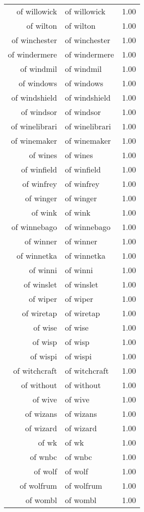 \begin{table}[ht]
\begin{tabular}{rlr}
  of willowick & of willowick & 1.00 \\ 
  of wilton & of wilton & 1.00 \\ 
  of winchester & of winchester & 1.00 \\ 
  of windermere & of windermere & 1.00 \\ 
  of windmil & of windmil & 1.00 \\ 
  of windows & of windows & 1.00 \\ 
  of windshield & of windshield & 1.00 \\ 
  of windsor & of windsor & 1.00 \\ 
  of winelibrari & of winelibrari & 1.00 \\ 
  of winemaker & of winemaker & 1.00 \\ 
  of wines & of wines & 1.00 \\ 
  of winfield & of winfield & 1.00 \\ 
  of winfrey & of winfrey & 1.00 \\ 
  of winger & of winger & 1.00 \\ 
  of wink & of wink & 1.00 \\ 
  of winnebago & of winnebago & 1.00 \\ 
  of winner & of winner & 1.00 \\ 
  of winnetka & of winnetka & 1.00 \\ 
  of winni & of winni & 1.00 \\ 
  of winslet & of winslet & 1.00 \\ 
  of wiper & of wiper & 1.00 \\ 
  of wiretap & of wiretap & 1.00 \\ 
  of wise & of wise & 1.00 \\ 
  of wisp & of wisp & 1.00 \\ 
  of wispi & of wispi & 1.00 \\ 
  of witchcraft & of witchcraft & 1.00 \\ 
  of without & of without & 1.00 \\ 
  of wive & of wive & 1.00 \\ 
  of wizans & of wizans & 1.00 \\ 
  of wizard & of wizard & 1.00 \\ 
  of wk & of wk & 1.00 \\ 
  of wnbc & of wnbc & 1.00 \\ 
  of wolf & of wolf & 1.00 \\ 
  of wolfrum & of wolfrum & 1.00 \\ 
  of wombl & of wombl & 1.00 \\ 

\end{tabular}
\end{table}
